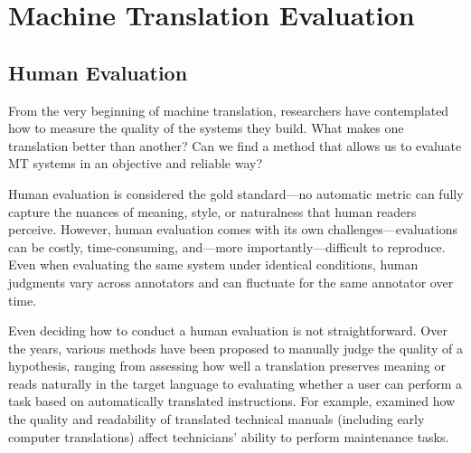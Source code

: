 \chapter{Machine Translation Evaluation}
\label{background}

\section{Human Evaluation}
\label{sec:human_evaluation}
From the very beginning of machine translation, researchers have contemplated how to measure the quality of the systems they build. What makes one translation better than another? Can we find a method that allows us to evaluate MT systems in an objective and reliable way?

Human evaluation is considered the gold standard---no automatic metric can fully capture the nuances of meaning, style, or naturalness that human readers perceive. However, human evaluation comes with its own challenges---evaluations can be costly, time-consuming, and---more importantly---difficult to reproduce. Even when evaluating the same system under identical conditions, human judgments vary across annotators and can fluctuate for the same annotator over time.

Even deciding how to conduct a human evaluation is not straightforward. Over the years, various methods have been proposed to manually judge the quality of a hypothesis, ranging from assessing how well a translation preserves meaning or reads naturally in the target language to evaluating whether a user can perform a task based on automatically translated instructions. For example, \cite{Sinaiko} examined how the quality and readability of translated technical manuals (including early computer translations) affect technicians’ ability to perform maintenance tasks.

